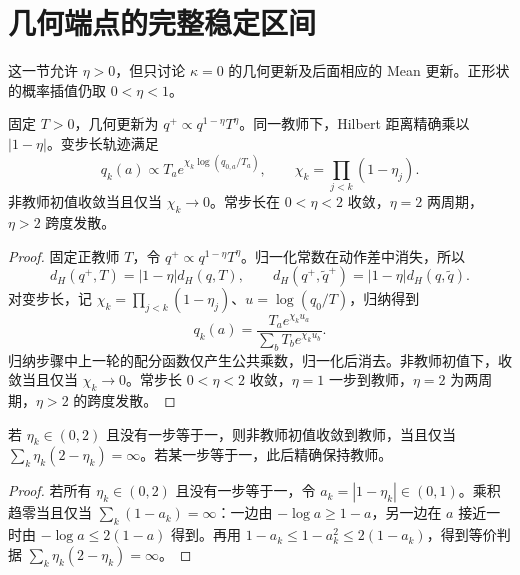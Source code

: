 \section{几何端点的完整稳定区间}
这一节允许 $\eta>0$，但只讨论 $\kappa=0$ 的几何更新及后面相应的 Mean 更新。正形状的概率插值仍取 $0<\eta<1$。

\begin{theorem}[几何端点的闭式轨迹与稳定分类]
固定 $T>0$，几何更新为 $q^+\propto q^{1-\eta}T^\eta$。同一教师下，Hilbert 距离精确乘以 $|1-\eta|$。变步长轨迹满足
\begin{equation}
q_k(a)\propto T_a e^{\chi_k\log(q_{0,a}/T_a)},\qquad
\chi_k=\prod_{j<k}(1-\eta_j).
\end{equation}
非教师初值收敛当且仅当 $\chi_k\to0$。常步长在 $0<\eta<2$ 收敛，$\eta=2$ 两周期，$\eta>2$ 跨度发散。
\end{theorem}
\begin{proof}
固定正教师 $T$，令 $q^+\propto q^{1-\eta}T^\eta$。归一化常数在动作差中消失，所以
\begin{equation}
d_H(q^+,T)=|1-\eta|d_H(q,T),\qquad
d_H(q^+,\widetilde q^+)=|1-\eta|d_H(q,\widetilde q).
\end{equation}
对变步长，记 $\chi_k=\prod_{j<k}(1-\eta_j)$、$u=\log(q_0/T)$，归纳得到
\begin{equation}
q_k(a)=\frac{T_ae^{\chi_ku_a}}{\sum_bT_be^{\chi_ku_b}}.
\end{equation}
归纳步骤中上一轮的配分函数仅产生公共乘数，归一化后消去。非教师初值下，收敛当且仅当 $\chi_k\to0$。常步长 $0<\eta<2$ 收敛，$\eta=1$ 一步到教师，$\eta=2$ 为两周期，$\eta>2$ 的跨度发散。
\end{proof}

\begin{proposition}[几何变步长的充要收敛条件]
若 $\eta_k\in(0,2)$ 且没有一步等于一，则非教师初值收敛到教师，当且仅当 $\sum_k\eta_k(2-\eta_k)=\infty$。若某一步等于一，此后精确保持教师。
\end{proposition}
\begin{proof}
若所有 $\eta_k\in(0,2)$ 且没有一步等于一，令 $a_k=|1-\eta_k|\in(0,1)$。乘积趋零当且仅当 $\sum_k(1-a_k)=\infty$：一边由 $-\log a\ge1-a$，另一边在 $a$ 接近一时由 $-\log a\le2(1-a)$ 得到。再用 $1-a_k\le1-a_k^2\le2(1-a_k)$，得到等价判据 $\sum_k\eta_k(2-\eta_k)=\infty$。
\end{proof}

